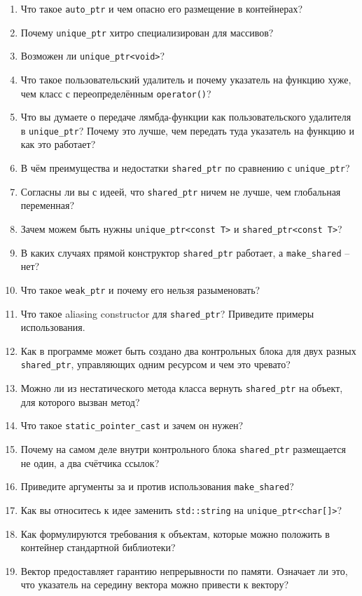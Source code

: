\documentclass[a4paper,12pt,oneside]{book}
\begin{document}
\begin{enumerate}
%
%
\item Что такое \lstinline!auto_ptr! и чем опасно его размещение в контейнерах?
\item Почему \lstinline!unique_ptr! хитро специализирован для массивов?
\item Возможен ли \lstinline!unique_ptr<void>!?
\item Что такое пользовательский удалитель и почему указатель на функцию хуже, чем класс с переопределённым \lstinline!operator()!?
\item Что вы думаете о передаче лямбда-функции как пользовательского удалителя в \lstinline!unique_ptr!? Почему это лучше, чем передать туда указатель на функцию и как это работает? 
\item В чём преимущества и недостатки \lstinline!shared_ptr! по сравнению с \lstinline!unique_ptr!?
\item Согласны ли вы с идеей, что \lstinline!shared_ptr! ничем не лучше, чем глобальная переменная?
\item Зачем можем быть нужны \lstinline!unique_ptr<const T>! и \lstinline!shared_ptr<const T>!?
\item В каких случаях прямой конструктор \lstinline!shared_ptr! работает, а \lstinline!make_shared! -- нет?
\item Что такое \lstinline!weak_ptr! и почему его нельзя разыменовать?
\item Что такое aliasing constructor для \lstinline!shared_ptr!? Приведите примеры использования.
\item Как в программе может быть создано два контрольных блока для двух разных \lstinline!shared_ptr!, управляющих одним ресурсом и чем это чревато?
\item Можно ли из нестатического метода класса вернуть \lstinline!shared_ptr! на объект, для которого вызван метод?
\item Что такое \lstinline!static_pointer_cast! и зачем он нужен?
\item Почему на самом деле внутри контрольного блока \lstinline!shared_ptr! размещается не один, а два счётчика ссылок?
\item Приведите аргументы за и против использования \lstinline!make_shared!?
\item Как вы относитесь к идее заменить \lstinline!std::string! на \lstinline!unique_ptr<char[]>!?
%
%
\item Как формулируются требования к объектам, которые можно положить в контейнер стандартной библиотеки?
\item Вектор предоставляет гарантию непрерывности по памяти. Означает ли это, что указатель на середину вектора можно привести к вектору?

\end{enumerate}
\end{document}
